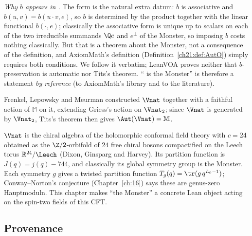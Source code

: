 \emph{Why $b$ appears in .}  The form is the natural extra datum: $b$ is associative and
$b(u,v)=b(u\cdot v,e)$, so $b$ is determined by the product together with the linear functional
$b(\cdot,e)$; classically the associative form is unique up to scalars on each of the two irreducible
summands $\Q e$ and $e^\perp$ of the Monster, so imposing $b$ costs nothing classically.  But that is a
theorem about the Monster, not a consequence of the definition, and AxiomMath's definition
(Definition~\ref{ch21:def:AutO}) simply requires both conditions.  We follow it verbatim; LeanVOA proves
neither that $b$-preservation is automatic nor Tits's theorem.  `` is the Monster'' is
therefore a statement \emph{by reference} (to AxiomMath's library and to the literature).

Frenkel, Lepowsky and Meurman constructed $\Vnat$ together with a faithful action of $\mathbb M$ on it,
extending Griess's action on $\Vnat_2$; since $\Vnat$ is generated by $\Vnat_2$, Tits's theorem then gives
$\Aut(\Vnat)=\mathbb M$.

\begin{physics}
$\Vnat$ is the chiral algebra of the holomorphic conformal field theory with $c=24$ obtained as the
$\Z/2$-orbifold of $24$ free chiral bosons compactified on the Leech torus $\mathbb{R}^{24}/\Leech$ (Dixon,
Ginsparg and Harvey).  Its partition function is $J(q)=j(q)-744$, and classically its global symmetry
group is the Monster.  Each symmetry $g$ gives a twisted partition function $T_g(q)=\tr(g\,q^{L_0-1})$;
Conway--Norton's conjecture (Chapter~\ref{ch:16}) says these are genus-zero Hauptmoduln.  This chapter
makes ``the Monster'' a concrete Lean object acting on the spin-two fields of this CFT.
\end{physics}

\subsection{Provenance}\label{ch21:sec:provenance}

